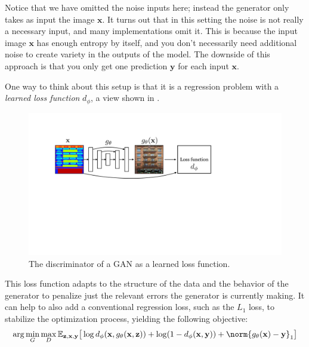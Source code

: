 Notice that we have omitted the noise inputs here; instead the generator only takes as input the image $\mathbf{x}$. It turns out that in this setting the noise is not really a necessary input, and many implementations omit it. This is because the input image $\mathbf{x}$ has enough entropy by itself, and you don't necessarily need additional noise to create variety in the outputs of the model. The downside of this approach is that you only get one prediction $\mathbf{y}$ for each input $\mathbf{x}$.

One way to think about this setup is that it is a regression problem with a \textit{learned loss function} $d_{
\phi}$, a view shown in \fig{\ref{fig:conditional_generative_models:cGAN_as_learned_loss}}.
\begin{figure}[h!]
    \centerline{
    \includegraphics[width=0.9\linewidth]{./figures/conditional_generative_models/cGAN_as_learned_loss.pdf}
    }
    \caption{The discriminator of a GAN as a learned loss function.}
    \label{fig:conditional_generative_models:cGAN_as_learned_loss}
\end{figure}

This loss function adapts to the structure of the data and the behavior of the generator to penalize just the relevant errors the generator is currently making. It can help to also add a conventional regression loss, such as the $L_1$ loss, to stabilize the optimization process, yielding the following objective:
\begin{align}
    \arg\min_G\max_D \mathbb{E}_{\mathbf{z},\mathbf{x},\mathbf{y}} \big[ \log d_{\phi}(\mathbf{x}, g_{\theta}(\mathbf{x},\mathbf{z})) + \log (1 - d_{\phi}(\mathbf{x}, \mathbf{y})) + \norm{g_{\theta}(\mathbf{x}) - \mathbf{y}}_1 \big]\label{eqn:conditional_generative_models:cGAN_objective_plus_L}
\end{align}

